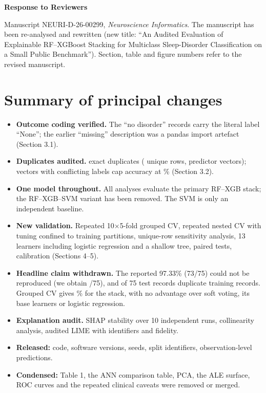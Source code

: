 \documentclass[11pt,a4paper]{article}
\begin{document}
\begin{center}\Large\textbf{Response to Reviewers}\end{center}
\noindent Manuscript NEURI-D-26-00299, \emph{Neuroscience Informatics}. The manuscript has been re-analysed and rewritten (new title: ``An Audited Evaluation of Explainable RF--XGBoost Stacking for Multiclass Sleep-Disorder Classification on a Small Public Benchmark''). Section, table and figure numbers refer to the revised manuscript.

\section*{Summary of principal changes}
\begin{itemize}
\item \textbf{Outcome coding verified.} The \NNone{} ``no disorder'' records carry the literal label ``None''; the earlier ``missing'' description was a pandas import artefact (Section 3.1).
\item \textbf{Duplicates audited.} \NDup{} exact duplicates (\NUnique{} unique rows, \NVec{} predictor vectors); \NConflictVec{} vectors with conflicting labels cap accuracy at \Ceiling\% (Section 3.2).
\item \textbf{One model throughout.} All analyses evaluate the primary RF--XGB stack; the RF--XGB--SVM variant has been removed. The SVM is only an independent baseline.
\item \textbf{New validation.} Repeated 10$\times$5-fold grouped CV, repeated nested CV with tuning confined to training partitions, unique-row sensitivity analysis, 13 learners including logistic regression and a shallow tree, paired tests, calibration (Sections 4--5).
\item \textbf{Headline claim withdrawn.} The reported 97.33\% (73/75) could not be reproduced (we obtain \OrigStackCorrect/75), and \OrigLeak{} of 75 test records duplicate training records. Grouped CV gives \AccStackG\% for the stack, with no advantage over soft voting, its base learners or logistic regression.
\item \textbf{Explanation audit.} SHAP stability over 10 independent runs, collinearity analysis, audited LIME with identifiers and fidelity.
\item \textbf{Released:} code, software versions, seeds, split identifiers, observation-level predictions.
\item \textbf{Condensed:} Table 1, the ANN comparison table, PCA, the ALE surface, ROC curves and the repeated clinical caveats were removed or merged.
\end{itemize}
\end{document}
